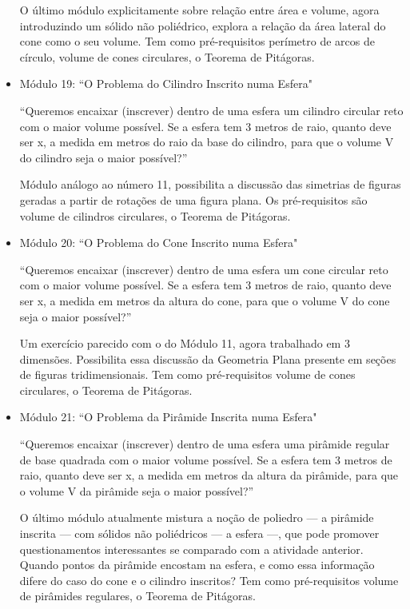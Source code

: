 \begin{itemize}
    O último módulo explicitamente sobre relação entre área e volume, agora introduzindo um sólido não poliédrico, explora a relação da área lateral do cone como o seu volume. Tem como pré-requisitos perímetro de arcos de círculo, volume de cones circulares, o Teorema de Pitágoras.
    
    \item Módulo 19: ``O Problema do Cilindro Inscrito numa Esfera"
    
    ``Queremos encaixar (inscrever) dentro de uma esfera um cilindro circular reto com o maior volume possível. Se a esfera tem 3 metros de raio, quanto deve ser x, a medida em metros do raio da base do cilindro, para que o volume V do cilindro seja o maior possível?”
    
    Módulo análogo ao número 11, possibilita a discussão das simetrias de figuras geradas a partir de rotações de uma figura plana. Os pré-requisitos são volume de cilindros circulares, o Teorema de Pitágoras.
    
    \item Módulo 20: ``O Problema do Cone Inscrito numa Esfera"
    
    ``Queremos encaixar (inscrever) dentro de uma esfera um cone circular reto com o maior volume possível. Se a esfera tem 3 metros de raio, quanto deve ser x, a medida em metros da altura do cone, para que o volume V do cone seja o maior possível?”
    
    Um exercício parecido com o do Módulo 11, agora trabalhado em 3 dimensões. Possibilita essa discussão da Geometria Plana presente em seções de figuras tridimensionais. Tem como pré-requisitos volume de cones circulares, o Teorema de Pitágoras.
    
    \item Módulo 21: ``O Problema da Pirâmide Inscrita numa Esfera"
    
    ``Queremos encaixar (inscrever) dentro de uma esfera uma pirâmide regular de base quadrada com o maior volume possível. Se a esfera tem 3 metros de raio, quanto deve ser x, a medida em metros da altura da pirâmide, para que o volume V da pirâmide seja o maior possível?”
    
    O último módulo atualmente mistura a noção de poliedro --- a pirâmide inscrita --- com sólidos não poliédricos --- a esfera ---, que pode promover questionamentos interessantes se comparado com a atividade anterior. Quando pontos da pirâmide encostam na esfera, e como essa informação difere do caso do cone e o cilindro inscritos? Tem como pré-requisitos volume de pirâmides regulares, o Teorema de Pitágoras.
\end{itemize}

